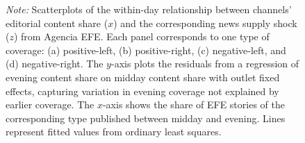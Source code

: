 \documentclass[12pt]{article}
\begin{document}
\begin{figure}[!htb]
\begin{tabular}{@{}cc@{}}
	\end{tabular}
	\caption*{\small \textit{Note:} Scatterplots of the within-day relationship between channels' editorial content share ($x$) 
		and the corresponding news supply shock ($z$) from Agencia EFE. Each panel corresponds to one type of coverage: 
		(a) positive-left, (b) positive-right, (c) negative-left, and (d) negative-right. The $y$-axis plots the residuals from 
		a regression of evening content share on midday content share with outlet fixed effects, capturing variation in evening 
		coverage not explained by earlier coverage. The $x$-axis shows the share of EFE stories of the corresponding type published 
		between midday and evening. Lines represent fitted values from ordinary least squares. }
	\label{fig:diff}
\end{figure}
\end{document}

